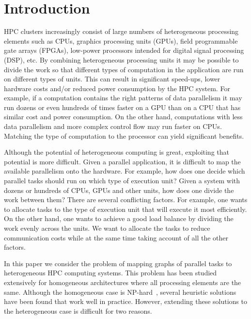\section{Introduction}
\label{sec:introduction}

HPC clusters increasingly consist of large numbers of heterogeneous
processing elements such as CPUs, graphics processing units (GPUs),
field programmable gate arrays (FPGAs), low-power processors intended
for digital signal processing (DSP), etc. By combining heterogeneous
processing units it may be possible to divide the work so that different
types of computation in the application are run on different types of
units. This can result in significant speed-ups, lower hardware costs
and/or reduced power consumption by the HPC system.  For example, if a
computation contains the right patterns of data parallelism it may run
dozens or even hundreds of times faster on a GPU than on a CPU that has
similar cost and power consumption. On the other hand, computations with
less data parallelism and more complex control flow may run faster on
CPUs. Matching the type of computation to the processor can yield
significant benefits.

Although the potential of heterogeneous computing is great, exploiting
that potential is more difficult. Given a parallel application, it is
difficult to map the available parallelism onto the hardware. For
example, how does one decide which parallel tasks should run on which
type of execution unit? Given a system with dozens or hundreds of CPUs,
GPUs and other units, how does one divide the work between them?  There
are several conflicting factors. For example, one wants to allocate
tasks to the type of execution unit that will execute it most
efficiently. On the other hand, one wants to achieve a good load balance
by dividing the work evenly across the units. %
We want to allocate the tasks to reduce communication costs while at the
same time taking account of all the other factors.

In this paper we consider the problem of mapping graphs of parallel
tasks to heterogeneous HPC computing systems. This problem has been
studied extensively for homogeneous architectures where all processing
elements are the same. Although the homogeneous case is
NP-hard~\cite{vsar89}, several heuristic solutions have been found that
work well in practice. However, extending these solutions to the
heterogeneous case is difficult for two reasons.

